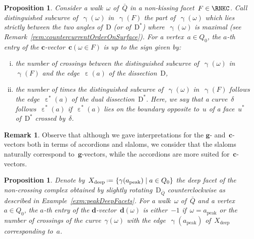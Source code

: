 \documentclass{amsart}
\newtheorem{proposition}[theorem]{Proposition}
\theoremstyle{definition}
\newtheorem{remark}[theorem]{Remark}
\renewcommand{\b}[1]{\mathbf{#1}} %
\newcommand{\set}[2]{\left\{ #1 \;\middle|\; #2 \right\}} %
\newcommand{\eqdef}{\mbox{\,\raisebox{0.2ex}{\scriptsize\ensuremath{\mathrm:}}\ensuremath{=}\,}} %
\newcommand{\darkblue}{\color{darkblue}} %
\newcommand{\defn}[1]{\textsl{\darkblue #1}} %
\newcommand{\peak}{\mathrm{peak}} %
\newcommand{\deep}{\mathrm{deep}} %
\newcommand{\dual}{^*} %
\newcommand{\dissection}{\mathrm{D}} %
\newcommand{\curveof}{\operatorname{\gamma}} %
\newcommand{\edgeof}{\operatorname{\varepsilon}} %
\newcommand{\dualedgeof}{\operatorname{\varepsilon}\dual} %
\newcommand{\dvector}[1]{\mathbf{d}(#1)} %
\newcommand{\cvector}[2]{\mathbf{c}(#1 \in #2)} %
\begin{document}
\begin{proposition}
\label{prop:cVectorsSurface}
Consider a walk~$\omega$ of~$\bar Q$ in a non-kissing facet~$F \in \RNKC$.
Call \defn{distinguished subcurve} of~$\curveof(\omega)$ in~$\curveof(F)$ the part of~$\curveof(\omega)$ which lies strictly between the two angles of~$\dissection$ (or of~$\dissection\dual$) where~$\curveof(\omega)$ is maximal (see Remark~\ref{rem:countercurrentOrderOnSurface}).
For a vertex~$a \in Q_0$, the $a$-th entry of the $\b{c}$-vector~$\cvector{\omega}{F}$ is up to the sign given by:
\begin{enumerate}[(i)]
\item the number of crossings between the distinguished subcurve of~$\curveof(\omega)$ in~$\curveof(F)$ and the edge~$\edgeof(a)$ of the dissection~$\dissection$,
\item the number of times the distinguished subcurve of~$\curveof(\omega)$ in~$\curveof(F)$ follows the edge~$\dualedgeof(a)$ of the dual dissection~$\dissection\dual$. Here, we say that a curve~$\delta$ follows~$\dualedgeof(a)$ if~$\dualedgeof(a)$ lies on the boundary opposite to~$u$ of a face~$u\dual$ of~$\dissection\dual$ crossed by~$\delta$.
\end{enumerate}
\end{proposition}

\begin{remark}
Observe that although we gave interpretations for the $\b{g}$- and~$\b{c}$-vectors both in terms of accordions and slaloms, we consider that the slaloms naturally correspond to~$\b{g}$-vectors, while the accordions are more suited for~$\b{c}$-vectors.
\end{remark}

\begin{proposition}
\label{prop:dVectorsSurface}
Denote by~$X_\deep \eqdef \set{\curveof(a_\peak)}{a \in Q_0}$ the deep facet of the non-crossing complex obtained by slightly rotating~$\dissection_{\bar Q}$ counterclockwise as described in Example~\ref{exm:peakDeepFacets}.
For a walk~$\omega$ of~$\bar Q$ and a vertex~$a \in Q_0$, the $a$-th entry of the $\b{d}$-vector~$\dvector{\omega}$ is either~$-1$ if~$\omega = a_\peak$ or the number of crossings of the curve~$\gamma(\omega)$ with the edge~$\curveof(a_\peak)$ of~$X_\deep$ corresponding to~$a$.
\end{proposition}
\end{document}
